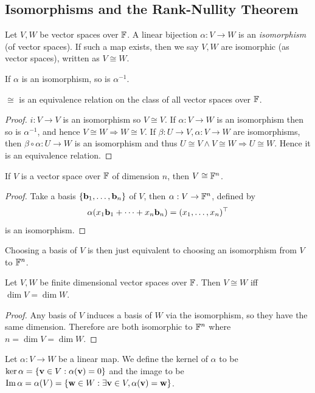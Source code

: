 \documentclass[a4paper]{article}
\begin{document}
\subsection{Isomorphisms and the Rank-Nullity Theorem}
\begin{definition}
    Let $V,W$ be vector spaces over ${\mathbb{F}}$.
    A linear bijection $\alpha:V\to W$ is an \textit{isomorphism} (of vector spaces).
    If such a map exists, then we say $V,W$ are isomorphic (as vector spaces), written as $V\cong W$.
\end{definition}
\begin{remark}
    If $\alpha$ is an isomorphism, so is $\alpha^{-1}$.
\end{remark}
\begin{lemma}
    $\cong$ is an equivalence relation on the class of all vector spaces over ${\mathbb{F}}$.
\end{lemma}
\begin{proof}
    $i:V\to V$ is an isomorphism so $ V \cong V $. If $ \alpha:V\to W $ is an isomorphism then so is $ \alpha^{-1} $, and hence $ V \cong W \Rightarrow W \cong V $. If $ \beta:U\to V,\alpha:V\to W $ are isomorphisms, then $ \beta\circ \alpha:U\to W $ is an isomorphism and thus $ U \cong V \land V \cong W \Rightarrow U \cong W $. Hence it is an equivalence relation.
\end{proof}
\begin{theorem}
    If $V$ is a vector space over ${\mathbb{F}}$ of dimension $n$, then $V\cong {\mathbb{F}}^n$.
\end{theorem}
\begin{proof}
    Take a basis $\{{\bf b}_1,\ldots,{\bf b}_n\}$ of $V$, then $ \alpha:V\to {\mathbb{F}}^n $, defined by
    $$\alpha(x_1{\bf b}_1+\cdots+x_n{\bf b}_n)=(x_1,\ldots,x_n)^\top$$
    is an isomorphism.
\end{proof}
\begin{remark}
    Choosing a basis of $V$ is then just equivalent to choosing an isomorphism from $V$ to ${\mathbb{F}}^n$.
\end{remark}
\begin{theorem}\label{isom iff same dim}
    Let $V,W$ be finite dimensional vector spaces over ${\mathbb{F}}$.
    Then $V\cong W$ iff $\dim V=\dim W$.
\end{theorem}
\begin{proof}
    Any basis of $V$ induces a basis of $W$ via the isomorphism, so they have the same dimension.
    Therefore are both isomorphic to ${\mathbb{F}}^n$ where $n=\dim V=\dim W$.
\end{proof}
\begin{definition}
    Let $\alpha:V\to W$ be a linear map.
    We define the kernel of $\alpha$ to be $\ker\alpha=\{{\bf v}\in V:\alpha({\bf v})=0\}$ and the image to be $\operatorname{Im}\alpha=\alpha(V)=\{{\bf w}\in W:\exists {\bf v}\in V,\alpha({\bf v})={\bf w}\}$.
\end{definition}
\end{document}
